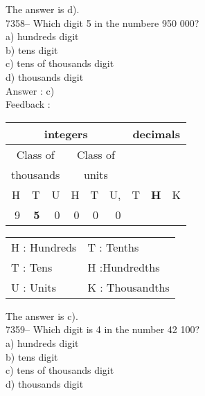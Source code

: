 \documentclass[letterpaper, 12pt]{article}
\begin{document}
\normalsize
The answer is d).\\





7358-- Which digit 5 in the numbere 950 000?\\

a) hundreds digit\\
b) tens digit\\
c) tens of thousands digit\\
d) thousands digit\\

Answer : c)\\

Feedback :\\
\begin{center}
\begin{tabular}{|rrr|rrr|rrr|}
\hline
\multicolumn{6}{|c|}{integers} &\multicolumn{3}{|c|}{decimals} \\
\hline
\multicolumn{3}{|c|}{Class of} &\multicolumn{3}{|c|}{Class of} &  \multicolumn{3}{c|}{} \\
\multicolumn{3}{|c|}{thousands} &\multicolumn{3}{|c|}{units} &  \multicolumn{3}{c|}{} \\
\hline
H & T & U &H & T & U, & T\up{th} & \textbf{H\up{th}} & K\up{th} \\
\hline
\hline
 9 & \textbf{5} & 0 & 0 & 0 & 0 & & &\\
\hline
\end{tabular}
\end{center}

\scriptsize
\begin{center}
\begin{tabular}{ll}
H : Hundreds & T\up{th} : Tenths\\
T : Tens & H\up{th} :Hundredths\\
U : Units & K\up{e} : Thousandths\\
\end{tabular}
\end{center}

\normalsize
The answer is c).\\





7359-- Which digit is 4 in the number 42 100?\\

a) hundreds digit\\
b) tens digit\\
c) tens of thousands digit\\
d) thousands digit\\
\end{document}
